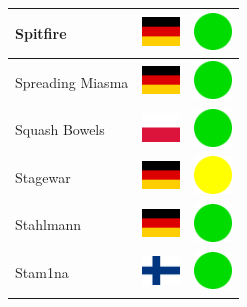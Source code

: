 \documentclass[12pt, a4paper, twoside]{report}
\begin{document}
\begin{center}
\begin{longtable}{|p{5cm}|p{2cm}|p{2cm}|}
 Spitfire                                                   & \includegraphics[width=1cm]{../4x3/de} &   \includegraphics[width=1cm]{../likes/y} \\ \hline
 Spreading Miasma                                           & \includegraphics[width=1cm]{../4x3/de} &   \includegraphics[width=1cm]{../likes/y} \\ \hline
 Squash Bowels                                              & \includegraphics[width=1cm]{../4x3/pl} &   \includegraphics[width=1cm]{../likes/y} \\ \hline
 Stagewar                                                   & \includegraphics[width=1cm]{../4x3/de} &   \includegraphics[width=1cm]{../likes/m} \\ \hline
 Stahlmann                                                  & \includegraphics[width=1cm]{../4x3/de} &   \includegraphics[width=1cm]{../likes/y} \\ \hline
 Stam1na                                                    & \includegraphics[width=1cm]{../4x3/fi} &   \includegraphics[width=1cm]{../likes/y} \\ \hline

\end{longtable}
\end{center}
\end{document}
